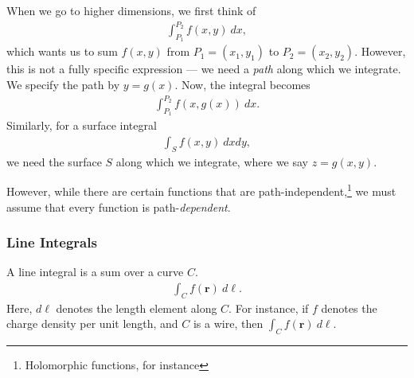 \documentclass[10pt]{mypackage}
\begin{document}
When we go to higher dimensions, we first think of
\begin{align*}
  \int_{P_1}^{P_2} f(x,y)\:dx,
\end{align*}
which wants us to sum $f(x,y)$ from $P_1 = \left(x_1,y_1\right)$ to $P_2 = \left(x_2,y_2\right)$. However, this is not a fully specific expression --- we need a \textit{path} along which we integrate. We specify the path by $y = g(x)$. Now, the integral becomes
\begin{align*}
  \int_{P_1}^{P_2} f\left(x,g(x)\right)\:dx.
\end{align*}
Similarly, for a surface integral
\begin{align*}
  \int_{S}^{} f(x,y)\:dx dy,
\end{align*}
we need the surface $S$ along which we integrate, where we say $z = g(x,y)$.\newline

However, while there are certain functions that are path-independent,\footnote{Holomorphic functions, for instance} we must assume that every function is path-\textit{dependent}.
\subsubsection{Line Integrals}%
A line integral is a sum over a curve $C$.
\begin{align*}
  \int_{C}^{} f\left(\mathbf{r}\right)\:d\ell.
\end{align*}
Here, $d\ell$ denotes the length element along $C$. For instance, if $f$ denotes the charge density per unit length, and $C$ is a wire, then $\int_{C}^{} f\left(\mathbf{r}\right)\:d\ell$.\newline
\end{document}
